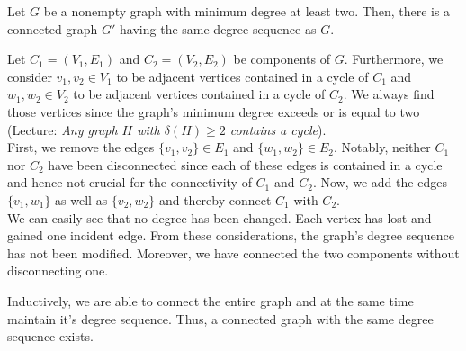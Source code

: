 \documentclass[a4paper]{article}
\begin{document}
\begin{solution}{5}
\begin{theorem}{Let $G$ be a nonempty graph with minimum degree at least two. Then, there is a connected graph $G'$ having the same degree sequence as $G$.}
\begin{center}
{
				}
			\end{center}

			Let $C_1 = (V_1, E_1)$ and $C_2 = (V_2, E_2)$ be components of $G$. Furthermore, we consider $v_1, v_2 \in V_1$ to be adjacent vertices contained in a cycle of $C_1$ and $w_1, w_2 \in V_2$ to be adjacent vertices contained in a cycle of $C_2$. We always find those vertices since the graph's minimum degree exceeds or is equal to two (Lecture: \emph{Any graph $H$ with $\delta(H) \geq 2$ contains a cycle}).\\

			First, we remove the edges $\{v_1, v_2\} \in E_1$ and $\{w_1, w_2\} \in E_2$. Notably, neither $C_1$ nor $C_2$ have been disconnected since each of these edges is contained in a cycle and hence not crucial for the connectivity of $C_1$ and $C_2$. Now, we add the edges $\{v_1, w_1\}$ as well as $\{v_2, w_2\}$ and thereby connect $C_1$ with $C_2$.\\
			
			We can easily see that no degree has been changed. Each vertex has lost and gained one incident edge. From these considerations, the graph's degree sequence has not been modified. Moreover, we have connected the two components without disconnecting one.

			Inductively, we are able to connect the entire graph and at the same time maintain it's degree sequence. Thus, a connected graph with the same degree sequence exists.

		\end{theorem}
	\end{solution}
	\newpage
\end{document}
